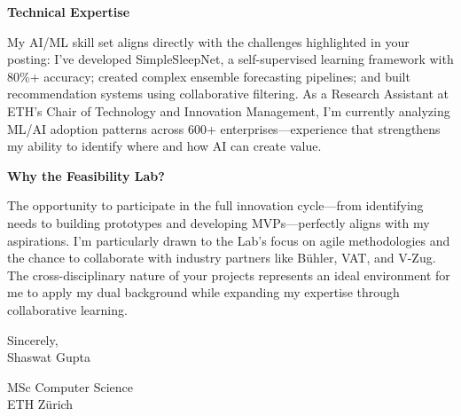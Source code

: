 \documentclass[letterpaper,10pt]{article}
\newcommand{\letterSection}[1]{%
  \begin{sectionbox}
    \color{darkroyalblue}\scshape\raggedright\large\bfseries #1
  \end{sectionbox}
}
\begin{document}
\letterSection{Technical Expertise}
\begin{justify}
My AI/ML skill set aligns directly with the challenges highlighted in your posting: I've developed SimpleSleepNet, a self-supervised learning framework with 80\%+ accuracy; created complex ensemble forecasting pipelines; and built recommendation systems using collaborative filtering. As a Research Assistant at ETH's Chair of Technology and Innovation Management, I'm currently analyzing ML/AI adoption patterns across 600+ enterprises—experience that strengthens my ability to identify where and how AI can create value.
\end{justify}


\letterSection{Why the Feasibility Lab?}
\begin{justify}
The opportunity to participate in the full innovation cycle—from identifying needs to building prototypes and developing MVPs—perfectly aligns with my aspirations. I'm particularly drawn to the Lab's focus on agile methodologies and the chance to collaborate with industry partners like Bühler, VAT, and V-Zug. The cross-disciplinary nature of your projects represents an ideal environment for me to apply my dual background while expanding my expertise through collaborative learning.
\end{justify}

\vspace{2pt}


\begin{justify}
Sincerely,\\
Shaswat Gupta
\end{justify}

\begin{justify}
\vspace{4 pt}
{\color{mutedtext}
MSc Computer Science\\
ETH Zürich
}
\end{justify}
\end{document}

